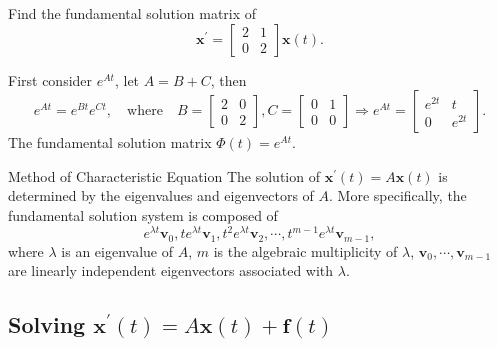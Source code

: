 \begin{example}{}{}
  Find the fundamental solution matrix of
  \begin{equation}
    \mathbf{x}^{\prime} =
    \begin{bmatrix}
      2 & 1\\
      0 & 2
    \end{bmatrix} \mathbf{x}(t).
  \end{equation}
\end{example}

\begin{solution}
  First consider $e^{At}$, let $A = B + C$, then
  \begin{equation}
    e^{At} = e^{Bt}e^{Ct}, \quad
    \text{where} \quad
    B =
    \begin{bmatrix}
      2 & 0\\
      0 & 2
    \end{bmatrix}, C =
    \begin{bmatrix}
      0 & 1\\
      0 & 0
    \end{bmatrix}
    \Rightarrow e^{At} =
    \begin{bmatrix}
      e^{2t} & t\\
      0 & e^{2t}
    \end{bmatrix}.
  \end{equation}
  The fundamental solution matrix $\Phi(t) = e^{At}$.
\end{solution}

\begin{proposition}{Method of Characteristic Equation}{}
  The solution of $\mathbf{x}^{\prime}(t) = A \mathbf{x}(t)$ is determined by the
  eigenvalues and eigenvectors of $A$.
  More specifically, the fundamental solution system is composed of
  \begin{equation}
    e^{\lambda t}\mathbf{v}_0, te^{\lambda t}\mathbf{v}_1, t^2e^{\lambda t}\mathbf{v}_2,\cdots, t^{m-1}e^{\lambda t}\mathbf{v}_{m-1},
  \end{equation}
  where $\lambda$ is an eigenvalue of $A$,
  $m$ is the algebraic multiplicity of $\lambda$,
  $\mathbf{v}_0,\cdots,\mathbf{v}_{m-1}$ are linearly independent eigenvectors associated with $\lambda$.
\end{proposition}

\subsection{Solving $\mathbf{x}^{\prime}(t) = A \mathbf{x}(t) + \mathbf{f}(t)$}





